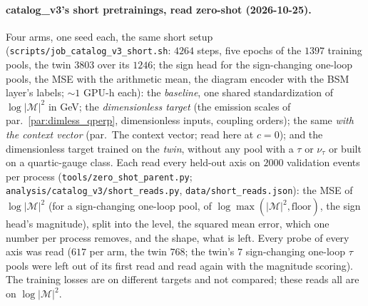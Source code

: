 \documentclass[11pt]{article}
\newcommand{\code}[1]{\texttt{#1}}
\begin{document}
\paragraph{catalog\_v3's short pretrainings, read zero-shot (2026-10-25).} Four arms, one seed each, the same short
setup (\code{scripts/job\_catalog\_v3\_short.sh}: $4264$ steps, five epochs of the $1397$ training pools, the twin $3803$
over its $1246$; the sign head for the sign-changing one-loop pools, the MSE with the arithmetic mean, the diagram
encoder with the BSM layer's labels; $\sim1$ GPU-h each): the \emph{baseline}, one shared standardization of
$\log|\mathcal M|^2$ in GeV; the \emph{dimensionless target} (the emission scales of par.~\ref{par:dimless_qperp},
dimensionless inputs, coupling orders); the same \emph{with the context vector} (par.\ The context vector; read here
at $c=0$); and the dimensionless target trained on the \emph{twin}, without any pool with a $\tau$ or $\nu_\tau$ or
built on a quartic-gauge class. Each read every held-out axis on $2000$ validation events per process
(\code{tools/zero\_shot\_parent.py}; \code{analysis/catalog\_v3/short\_reads.py}, \code{data/short\_reads.json}): the
MSE of $\log|\mathcal M|^2$ (for a sign-changing one-loop pool, of $\log\max(|\mathcal M|^2,\text{floor})$, the sign
head's magnitude), split into the level, the squared mean error, which one number per process removes, and the shape,
what is left. Every probe of every axis was read ($617$ per arm, the twin $768$; the twin's $7$ sign-changing one-loop
$\tau$ pools were left out of its first read and read again with the magnitude scoring). The training
losses are on different targets and not compared; these reads all are on $\log|\mathcal M|^2$.
\end{document}
